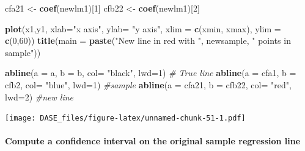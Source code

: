 \documentclass[]{book}
\newenvironment{Shaded}{\begin{snugshade}}{\end{snugshade}}
\newcommand{\KeywordTok}[1]{\textcolor[rgb]{0.13,0.29,0.53}{\textbf{{#1}}}}
\newcommand{\DataTypeTok}[1]{\textcolor[rgb]{0.13,0.29,0.53}{{#1}}}
\newcommand{\DecValTok}[1]{\textcolor[rgb]{0.00,0.00,0.81}{{#1}}}
\newcommand{\StringTok}[1]{\textcolor[rgb]{0.31,0.60,0.02}{{#1}}}
\newcommand{\CommentTok}[1]{\textcolor[rgb]{0.56,0.35,0.01}{\textit{{#1}}}}
\newcommand{\NormalTok}[1]{{#1}}
\let\oldparagraph\paragraph
\renewcommand{\paragraph}[1]{\oldparagraph{#1}\mbox{}}
\begin{document}
\begin{Shaded}
\begin{Highlighting}[]
\NormalTok{cfa21 <-}\StringTok{ }\KeywordTok{coef}\NormalTok{(newlm1)[}\DecValTok{1}\NormalTok{]}
\NormalTok{cfb22 <-}\StringTok{ }\KeywordTok{coef}\NormalTok{(newlm1)[}\DecValTok{2}\NormalTok{]}

\KeywordTok{plot}\NormalTok{(x1,y1, }\DataTypeTok{xlab=}\StringTok{"x axis"}\NormalTok{, }\DataTypeTok{ylab=} \StringTok{"y axis"}\NormalTok{, }\DataTypeTok{xlim =} \KeywordTok{c}\NormalTok{(xmin, xmax), }\DataTypeTok{ylim =} \KeywordTok{c}\NormalTok{(}\DecValTok{0}\NormalTok{,}\DecValTok{60}\NormalTok{))}
\KeywordTok{title}\NormalTok{(}\DataTypeTok{main =} \KeywordTok{paste}\NormalTok{(}\StringTok{"New line in red with "}\NormalTok{, newsample, }\StringTok{" points in sample"}\NormalTok{))}

\KeywordTok{abline}\NormalTok{(}\DataTypeTok{a =} \NormalTok{a, }\DataTypeTok{b =} \NormalTok{b, }\DataTypeTok{col=} \StringTok{"black"}\NormalTok{, }\DataTypeTok{lwd=}\DecValTok{1}\NormalTok{)  }\CommentTok{# True line}
\KeywordTok{abline}\NormalTok{(}\DataTypeTok{a =} \NormalTok{cfa1, }\DataTypeTok{b =} \NormalTok{cfb2, }\DataTypeTok{col=} \StringTok{"blue"}\NormalTok{, }\DataTypeTok{lwd=}\DecValTok{1}\NormalTok{)  }\CommentTok{#sample}
\KeywordTok{abline}\NormalTok{(}\DataTypeTok{a =} \NormalTok{cfa21, }\DataTypeTok{b =} \NormalTok{cfb22, }\DataTypeTok{col=} \StringTok{"red"}\NormalTok{, }\DataTypeTok{lwd=}\DecValTok{2}\NormalTok{) }\CommentTok{#new line}
\end{Highlighting}
\end{Shaded}

\texttt{[image: DASE\_files/figure-latex/unnamed-chunk-51-1.pdf]}

\paragraph{Compute a confidence interval on the original sample
regression
line}\label{compute-a-confidence-interval-on-the-original-sample-regression-line}
\end{document}
